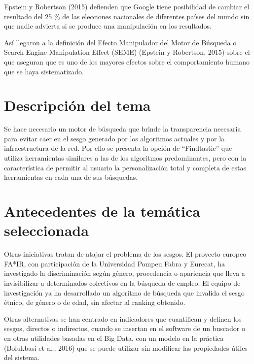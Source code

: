 \documentclass{article}
\begin{document}
Epstein y Robertson (2015) defienden que Google tiene posibilidad de cambiar el resultado del 25 \% de las elecciones nacionales de diferentes países del mundo sin que nadie advierta si se produce una manipulación en los resultados.

Así llegaron a la definición del Efecto Manipulador del Motor de Búsqueda o Search Engine Manipulation Effect (SEME) (Epstein y Robertson, 2015) sobre el que aseguran que es uno de los mayores efectos sobre el comportamiento humano que se haya sistematizado.

\section*{Descripción del tema}
Se hace necesario un motor de búsqueda que brinde la transparencia necesaria para evitar caer en el sesgo generado por los algoritmos actuales y por la infraestructura de la red. Por ello se presenta la opción de “Findtastic” que utiliza herramientas similares a las de los algoritmos predominantes, pero con la característica de permitir al usuario la personalización total y completa de estas herramientas en cada una de sus búsquedas.

\section*{Antecedentes de la temática seleccionada}
Otras iniciativas tratan de atajar el problema de los sesgos. El proyecto europeo FA*IR, con participación de la Universidad Pompeu Fabra y Eurecat, ha investigado la discriminación según género, procedencia o apariencia que lleva a invisibilizar a determinados colectivos en la búsqueda de empleo. El equipo de investigación ya ha desarrollado un algoritmo de búsqueda que invalida el sesgo étnico, de género o de edad, sin afectar al ranking obtenido. 

Otras alternativas se han centrado en indicadores que cuantifican y definen los sesgos, directos o indirectos, cuando se insertan en el software de un buscador o en otras utilidades basadas en el Big Data, con un modelo en la práctica (Bolukbasi et al., 2016) que se puede utilizar sin modificar las propiedades útiles del sistema. 
\end{document}
